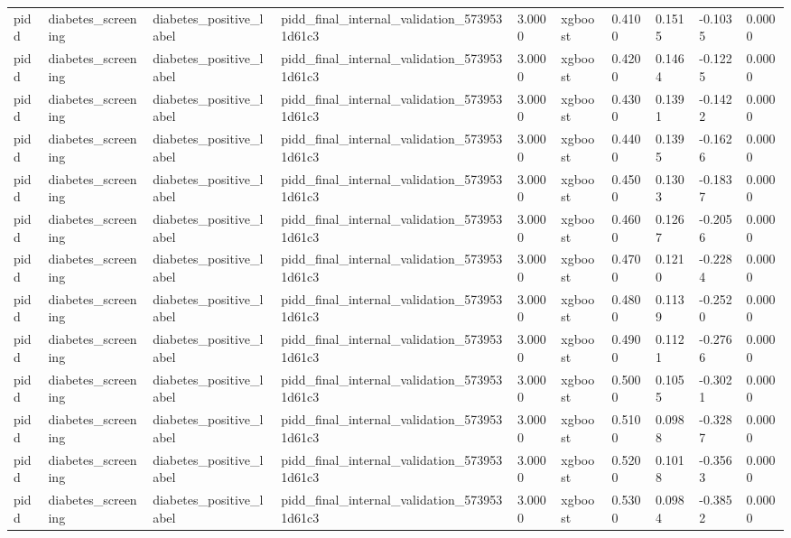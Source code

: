 \begin{tabular}{llllllllll}
pidd & diabetes\_screening & diabetes\_positive\_label & pidd\_final\_internal\_validation\_5739531d61c3 & 3.0000 & xgboost & 0.4100 & 0.1515 & -0.1035 & 0.0000 \\
pidd & diabetes\_screening & diabetes\_positive\_label & pidd\_final\_internal\_validation\_5739531d61c3 & 3.0000 & xgboost & 0.4200 & 0.1464 & -0.1225 & 0.0000 \\
pidd & diabetes\_screening & diabetes\_positive\_label & pidd\_final\_internal\_validation\_5739531d61c3 & 3.0000 & xgboost & 0.4300 & 0.1391 & -0.1422 & 0.0000 \\
pidd & diabetes\_screening & diabetes\_positive\_label & pidd\_final\_internal\_validation\_5739531d61c3 & 3.0000 & xgboost & 0.4400 & 0.1395 & -0.1626 & 0.0000 \\
pidd & diabetes\_screening & diabetes\_positive\_label & pidd\_final\_internal\_validation\_5739531d61c3 & 3.0000 & xgboost & 0.4500 & 0.1303 & -0.1837 & 0.0000 \\
pidd & diabetes\_screening & diabetes\_positive\_label & pidd\_final\_internal\_validation\_5739531d61c3 & 3.0000 & xgboost & 0.4600 & 0.1267 & -0.2056 & 0.0000 \\
pidd & diabetes\_screening & diabetes\_positive\_label & pidd\_final\_internal\_validation\_5739531d61c3 & 3.0000 & xgboost & 0.4700 & 0.1210 & -0.2284 & 0.0000 \\
pidd & diabetes\_screening & diabetes\_positive\_label & pidd\_final\_internal\_validation\_5739531d61c3 & 3.0000 & xgboost & 0.4800 & 0.1139 & -0.2520 & 0.0000 \\
pidd & diabetes\_screening & diabetes\_positive\_label & pidd\_final\_internal\_validation\_5739531d61c3 & 3.0000 & xgboost & 0.4900 & 0.1121 & -0.2766 & 0.0000 \\
pidd & diabetes\_screening & diabetes\_positive\_label & pidd\_final\_internal\_validation\_5739531d61c3 & 3.0000 & xgboost & 0.5000 & 0.1055 & -0.3021 & 0.0000 \\
pidd & diabetes\_screening & diabetes\_positive\_label & pidd\_final\_internal\_validation\_5739531d61c3 & 3.0000 & xgboost & 0.5100 & 0.0988 & -0.3287 & 0.0000 \\
pidd & diabetes\_screening & diabetes\_positive\_label & pidd\_final\_internal\_validation\_5739531d61c3 & 3.0000 & xgboost & 0.5200 & 0.1018 & -0.3563 & 0.0000 \\
pidd & diabetes\_screening & diabetes\_positive\_label & pidd\_final\_internal\_validation\_5739531d61c3 & 3.0000 & xgboost & 0.5300 & 0.0984 & -0.3852 & 0.0000 \\

\end{tabular}
